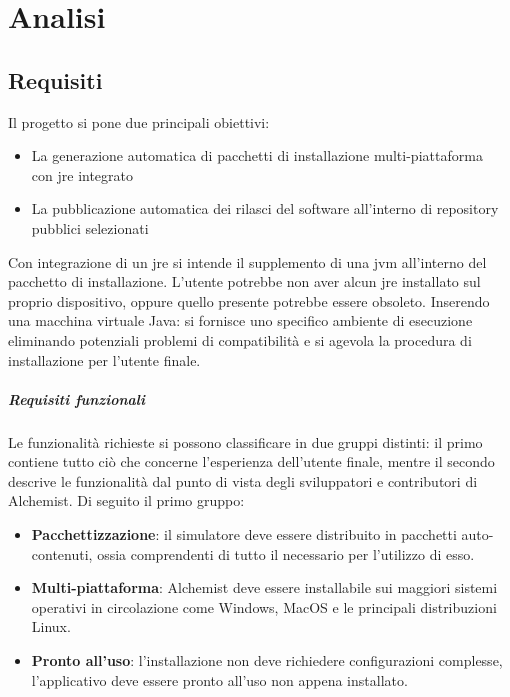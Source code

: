 \chapter{Analisi}

\section{Requisiti}

Il progetto si pone due principali obiettivi:
\begin{itemize}
	\setlength\itemsep{0.8em}
	\item La generazione automatica di pacchetti di installazione multi-piattaforma \\ con \ac{jre} integrato
	\item La pubblicazione automatica dei rilasci del software all'interno di repository pubblici selezionati
\end{itemize}
Con integrazione di un \ac{jre} si intende il supplemento di una \ac{jvm} all'interno del pacchetto di installazione.
L'utente potrebbe non aver alcun \ac{jre} installato sul proprio dispositivo, oppure quello presente potrebbe essere obsoleto. Inserendo una macchina virtuale Java: si fornisce uno specifico ambiente di esecuzione eliminando potenziali problemi di compatibilità e si agevola la procedura di installazione per l'utente finale.

\paragraph{Requisiti funzionali}

Le funzionalità richieste si possono classificare in due gruppi distinti: il primo contiene tutto ciò che concerne l'esperienza dell'utente finale, mentre il secondo descrive le funzionalità dal punto di vista degli sviluppatori e contributori di Alchemist. Di seguito il primo gruppo:
\begin{itemize}
	\item \textbf{Pacchettizzazione}: il simulatore deve essere distribuito in pacchetti auto-contenuti, ossia comprendenti di tutto il necessario per l'utilizzo di esso.
	\item \textbf{Multi-piattaforma}: Alchemist deve essere installabile sui maggiori sistemi operativi in circolazione come Windows, MacOS e le principali distribuzioni Linux.
	\item \textbf{Pronto all'uso}: l'installazione non deve richiedere configurazioni complesse, l'applicativo deve essere pronto all'uso non appena installato.
\end{itemize}

